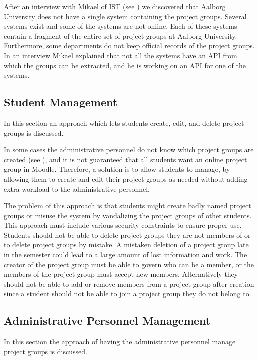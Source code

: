 After an interview with Mikael of IST (see ) we discovered that Aalborg University does not have a single system containing the project groups.
Several systems exist and some of the systems are not online.
Each of these systems contain a fragment of the entire set of project groups at Aalborg University.
Furthermore, some departments do not keep official records of the project groups.
In an interview Mikael explained that not all the systems have an API from which the groups can be extracted, and he is working on an API for one of the systems.





\subsection{Student Management}
\label{sub:studentmangement}
In this section an approach which lets students create, edit, and delete project groups is discussed. 

In some cases the administrative personnel do not know which project groups are created (see ), and it is not guaranteed that all students want an online project group in Moodle. 
Therefore, a solution is to allow students to manage, by allowing them to create and edit their project groups as needed without adding extra workload to the administrative personnel.

The problem of this approach is that students might create badly named project groups or misuse the system by vandalizing the project groups of other students. 
This approach must include various security constraints to ensure proper use. 
Students should not be able to delete project groups they are not members of or to delete project groups by mistake. 
A mistaken deletion of a project group late in the semester could lead to a large amount of lost information and work. 
The creator of the project group must be able to govern who can be a member, or the members of the project group must accept new members.
Alternatively they should not be able to add or remove members from a project group after creation since a student should not be able to join a project group they do not belong to. 


\subsection{Administrative Personnel Management}
In this section the approach of having the administrative personnel manage project groups is discussed. 

